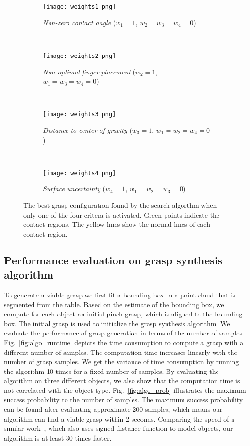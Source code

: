 \begin{figure}[!htb]
    \centering
    \begin{subfigure}[b]{0.45\textwidth}
        \texttt{[image: weights1.png]}
        \caption{\textit{Non-zero contact angle} ($w_1 = 1$, $w_2=w_3=w_4=0$)}
        \label{fig:weights1}
    \end{subfigure}
    ~ %
    \begin{subfigure}[b]{0.45\textwidth}
        \texttt{[image: weights2.png]}
        \caption{\textit{Non-optimal finger placement} ($w_2 = 1$, $w_1=w_3=w_4=0$)}
        \label{fig:weights2}
    \end{subfigure}
    ~ %
    \begin{subfigure}[b]{0.45\textwidth}
        \texttt{[image: weights3.png]}
        \caption{\textit{Distance to center of gravity} ($w_3 = 1$, $w_1=w_2=w_4=0$)}
        \label{fig:weights3}
    \end{subfigure}
	~
    \begin{subfigure}[b]{0.45\textwidth}
        \texttt{[image: weights4.png]}
        \caption{\textit{Surface uncertainty} ($w_4 = 1$, $w_1 = w_2 = w_3 = 0$)}
        \label{fig:weights4}
    \end{subfigure}
    \caption{The best grasp configuration found by the search algorthm when only one of the four critera is activated. Green points indicate the contact regions. The yellow lines show the normal lines of each contact region.}\label{fig:weights_evaluation}
\end{figure}

\subsection{Performance evaluation on grasp synthesis algorithm}
To generate a viable grasp we first fit a bounding box to a point cloud that is segmented from the table. Based on the estimate of the bounding box, we compute for each object an initial pinch grasp, which is aligned to the bounding box. The initial grasp is used
to initialize the grasp synthesis algorithm. We evaluate the performance of grasp generation in terms of the number of samples. Fig.~\ref{fig:algo_runtime} depicts the time consumption to compute a grasp with a  different number of samples. The computation time increases linearly with the number of grasp samples. We get the variance of time consumption by running the algorithm 10 times for a fixed number of samples. By evaluating the algorithm on three different objects, we also show that the computation time is not correlated with the object type. Fig.~\ref{fig:algo_prob} illustrates the maximum success probability to the number of samples. The maximum success probability can be found after evaluating approximate 200 samples, which means our algorithm can find a viable grasp within 2 seconds. Comparing the speed of a similar work~\cite{Mahler2015}, which also uses signed distance function to model objects, our algorithm is at least 30 times faster.

